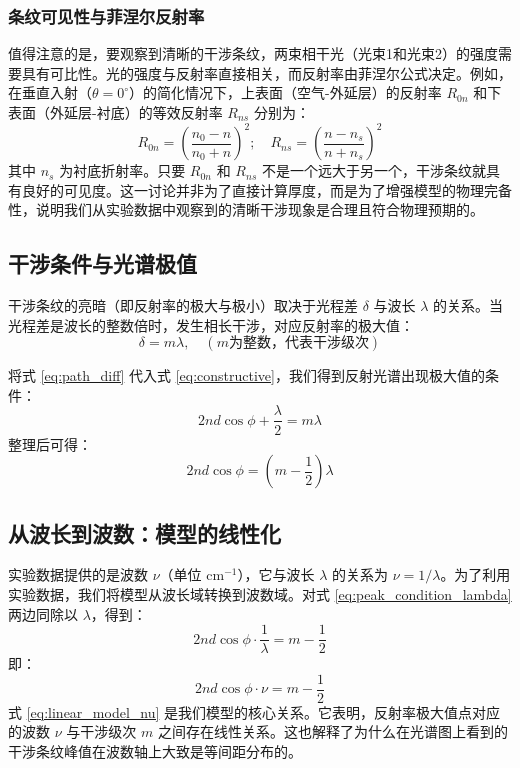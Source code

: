 \documentclass[withoutpreface,bwprint]{cumcmthesis} %
\begin{document}
\subsubsection{条纹可见性与菲涅尔反射率}
值得注意的是，要观察到清晰的干涉条纹，两束相干光（光束1和光束2）的强度需要具有可比性。光的强度与反射率直接相关，而反射率由菲涅尔公式决定。例如，在垂直入射（$\theta=0^\circ$）的简化情况下，上表面（空气-外延层）的反射率 $R_{0n}$ 和下表面（外延层-衬底）的等效反射率 $R_{ns}$ 分别为：
\begin{equation}
    R_{0n}=\left(\frac{n_0-n}{n_0+n}\right)^2; \quad R_{ns}=\left(\frac{n-n_s}{n+n_s}\right)^2
\end{equation}
其中 $n_s$ 为衬底折射率。只要 $R_{0n}$ 和 $R_{ns}$ 不是一个远大于另一个，干涉条纹就具有良好的可见度。这一讨论并非为了直接计算厚度，而是为了增强模型的物理完备性，说明我们从实验数据中观察到的清晰干涉现象是合理且符合物理预期的。

\subsection{干涉条件与光谱极值}

干涉条纹的亮暗（即反射率的极大与极小）取决于光程差 $\delta$ 与波长 $\lambda$ 的关系。当光程差是波长的整数倍时，发生相长干涉，对应反射率的极大值：
\begin{equation}
    \delta = m\lambda, \quad (m \text{为整数，代表干涉级次})
    \label{eq:constructive}
\end{equation}

将式 \eqref{eq:path_diff} 代入式 \eqref{eq:constructive}，我们得到反射光谱出现极大值的条件：
\begin{equation}
    2nd\cos\phi + \frac{\lambda}{2} = m\lambda
\end{equation}
整理后可得：
\begin{equation}
    2nd\cos\phi = \left(m - \frac{1}{2}\right)\lambda
    \label{eq:peak_condition_lambda}
\end{equation}

\subsection{从波长到波数：模型的线性化}

实验数据提供的是波数 $\nu$（单位 cm$^{-1}$），它与波长 $\lambda$ 的关系为 $\nu = 1/\lambda$。为了利用实验数据，我们将模型从波长域转换到波数域。对式 \eqref{eq:peak_condition_lambda} 两边同除以 $\lambda$，得到：
\begin{equation}
    2nd\cos\phi \cdot \frac{1}{\lambda} = m - \frac{1}{2}
\end{equation}
即：
\begin{equation}
    2nd\cos\phi \cdot \nu = m - \frac{1}{2}
    \label{eq:linear_model_nu}
\end{equation}
式 \eqref{eq:linear_model_nu} 是我们模型的核心关系。它表明，反射率极大值点对应的波数 $\nu$ 与干涉级次 $m$ 之间存在线性关系。这也解释了为什么在光谱图上看到的干涉条纹峰值在波数轴上大致是等间距分布的。
\end{document}
